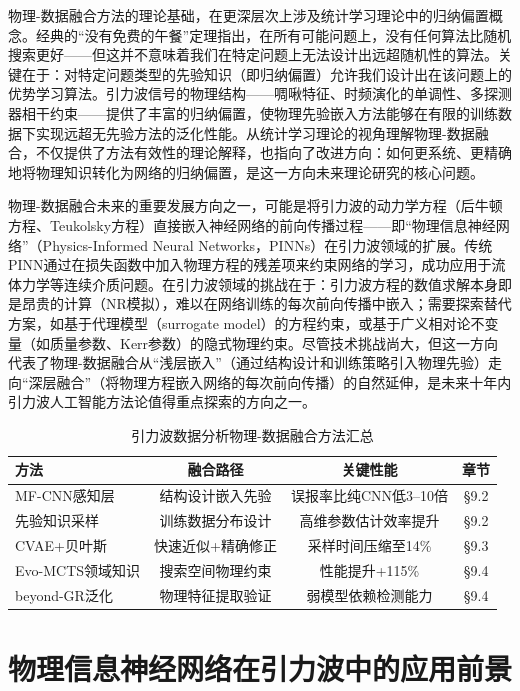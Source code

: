 物理-数据融合方法的理论基础，在更深层次上涉及统计学习理论中的归纳偏置概念。经典的“没有免费的午餐”定理指出，在所有可能问题上，没有任何算法比随机搜索更好——但这并不意味着我们在特定问题上无法设计出远超随机性的算法。关键在于：对特定问题类型的先验知识（即归纳偏置）允许我们设计出在该问题上的优势学习算法。引力波信号的物理结构——啁啾特征、时频演化的单调性、多探测器相干约束——提供了丰富的归纳偏置，使物理先验嵌入方法能够在有限的训练数据下实现远超无先验方法的泛化性能。从统计学习理论的视角理解物理-数据融合，不仅提供了方法有效性的理论解释，也指向了改进方向：如何更系统、更精确地将物理知识转化为网络的归纳偏置，是这一方向未来理论研究的核心问题。

物理-数据融合未来的重要发展方向之一，可能是将引力波的动力学方程（后牛顿方程、Teukolsky方程）直接嵌入神经网络的前向传播过程——即“物理信息神经网络”（Physics-Informed Neural Networks，PINNs）在引力波领域的扩展。传统PINN通过在损失函数中加入物理方程的残差项来约束网络的学习，成功应用于流体力学等连续介质问题。在引力波领域的挑战在于：引力波方程的数值求解本身即是昂贵的计算（NR模拟），难以在网络训练的每次前向传播中嵌入；需要探索替代方案，如基于代理模型（surrogate model）的方程约束，或基于广义相对论不变量（如质量参数、Kerr参数）的隐式物理约束。尽管技术挑战尚大，但这一方向代表了物理-数据融合从“浅层嵌入”（通过结构设计和训练策略引入物理先验）走向“深层融合”（将物理方程嵌入网络的每次前向传播）的自然延伸，是未来十年内引力波人工智能方法论值得重点探索的方向之一。

\begin{table}[htbp]
\centering
\caption{引力波数据分析物理-数据融合方法汇总}
\label{tab:fusion_methods}
\small
\begin{tabular}{lccc}
\hline
\textbf{方法} & \textbf{融合路径} & \textbf{关键性能} & \textbf{章节} \\
\hline
MF-CNN感知层 & 结构设计嵌入先验 & 误报率比纯CNN低3--10倍 & §9.2 \\
先验知识采样 & 训练数据分布设计 & 高维参数估计效率提升 & §9.2 \\
CVAE+贝叶斯 & 快速近似+精确修正 & 采样时间压缩至14\% & §9.3 \\
Evo-MCTS领域知识 & 搜索空间物理约束 & 性能提升+115\% & §9.4 \\
beyond-GR泛化 & 物理特征提取验证 & 弱模型依赖检测能力 & §9.4 \\
\hline
\end{tabular}
\end{table}

\section{物理信息神经网络在引力波中的应用前景}

